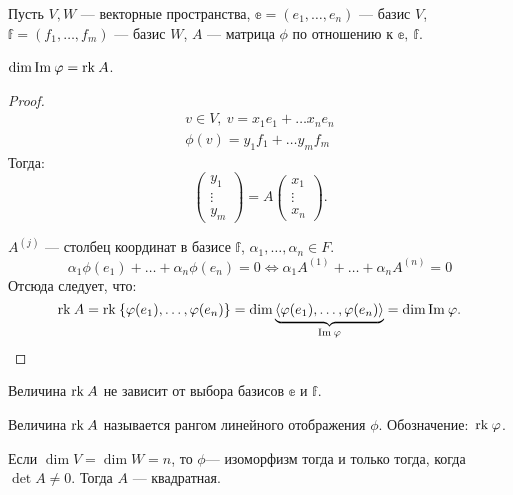 Пусть $V, W$ --- векторные пространства, $\mathbb{e} = (e_1, \ldots, e_n)$ --- базис $V$, $\mathbb{f} = (f_1, \ldots, f_m)$ --- базис $W$, $A$ --- матрица $\phi$ по отношению к $\mathbb{e},\ \mathbb{f}$.

\begin{Suggestion}
    $\dim \mathrm{Im\:} \varphi = \mathrm{rk}\: A$.
\end{Suggestion}

\begin{proof}
    \begin{gather*}
        v \in V,\ v = x_1e_1 + \ldots x_ne_n\\
        \phi(v) = y_1f_1 + \ldots y_mf_m 
    \end{gather*}
    Тогда:
    $$
    \begin{pmatrix}
        y_1\\
        \vdots\\
        y_m
    \end{pmatrix}
    = A \begin{pmatrix}
        x_1\\
        \vdots\\
        x_n
    \end{pmatrix}.
    $$
   \par  $A^{\left(j\right)}$ --- столбец координат в базисе $\mathbb{f}$, $\alpha_1, \ldots, \alpha_n \in F$.
   \[
        \alpha_1 \phi(e_1) + \ldots + \alpha_n \phi(e_n) = 0 \Leftrightarrow \alpha_1 A^{\left(1\right)} + \ldots + \alpha_n A^{\left(n\right)} = 0
   \]
   Отсюда следует, что:
   \[
        \mathrm{rk}\: A = \mathrm{rk}\:\{\varphi(e_1), \ldots, \varphi(e_n)\} = \dim \underbrace{\langle\varphi(e_1), \ldots, \varphi(e_n)\rangle}_{\mathrm{Im\:}\varphi} = \dim \mathrm{Im\:} \varphi.
   \]
\end{proof}

\begin{Consequence}
    Величина $\mathrm{rk}\: A$ не зависит от выбора базисов $\mathbb{e}$ и $\mathbb{f}$.
\end{Consequence}

\begin{Def}
    Величина $\mathrm{rk}\: A$ называется рангом линейного отображения $\phi$. Обозначение:~$\mathrm{rk}\: \varphi$.
\end{Def}

\begin{Consequence}
    Если $\dim V = \dim W = n$, то $\phi$--- изоморфизм тогда и только тогда, когда $\det A \neq 0$. Тогда $A$ --- квадратная.
\end{Consequence}

